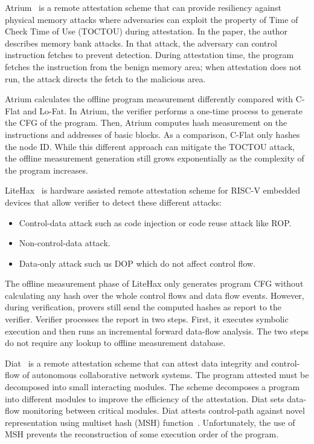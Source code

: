Atrium~\cite{zeitouniATRIUMRuntimeAttestation2017} is a remote attestation
scheme that can provide resiliency against physical memory attacks where
adversaries can exploit the property of Time of Check Time of Use (TOCTOU)
during attestation. In the paper, the author describes memory bank attacks. In
that attack, the adversary can control instruction fetches to prevent detection.
During attestation time, the program fetches the instruction from the benign
memory area; when attestation does not run, the attack directs the fetch to the
malicious area.

Atrium calculates the offline program measurement  differently compared with
C-Flat and Lo-Fat. In Atrium, the verifier performs a one-time process to
generate the CFG of the program. Then, Atrium computes hash measurement on the
instructions and addresses of basic blocks. As a comparison, C-Flat only hashes
the node ID. While this different approach can mitigate the TOCTOU attack, the
offline measurement generation still grows exponentially as the complexity of
the program increases.

LiteHax~\cite{dessoukyLiteHAXLightweightHardwareassisted2018} is hardware
assisted remote attestation scheme  for RISC-V embedded devices that allow
verifier to detect these different attacks:

\begin{itemize}
    \item Control-data attack such as code injection or code reuse attack like
    ROP.
    \item Non-control-data attack.
    \item Data-only attack such us DOP which do not affect control flow.
\end{itemize}

The offline measurement phase of LiteHax only generates program CFG without
calculating any hash over the whole control flows and data flow events. However,
during verification, provers still send the computed hashes as report to the
verifier. Verifier processes the report in two steps. First, it executes
symbolic execution and then runs an incremental forward data-flow analysis. The
two steps do not require any lookup to offline measurement database.

Diat~\cite{aberaDIATDataIntegrity2019} is a remote attestation scheme that can
attest data integrity and control-flow of autonomous collaborative network
systems. The program attested must be decomposed into small interacting modules.
The scheme decomposes a program into different modules to improve the efficiency
of the attestation. Diat sets data-flow monitoring between critical modules.
Diat attests control-path against novel representation using multiset hash (MSH)
function~\cite{clarkeIncrementalMultisetHash2003}. Unfortunately, the use of MSH
prevents the reconstruction of some execution order of the program.

